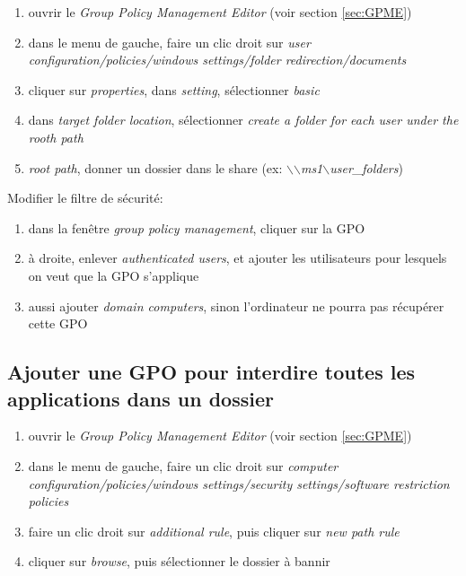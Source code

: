 \documentclass[a4paper]{article}
\begin{document}
\begin{enumerate}
    \item ouvrir le \textit{Group Policy Management Editor} (voir section \ref{sec:GPME})
    \item dans le menu de gauche, faire un clic droit sur \textit{user configuration/policies/windows settings/folder redirection/documents}
    \item cliquer sur \textit{properties}, dans \textit{setting}, sélectionner \textit{basic}
    \item dans \textit{target folder location}, sélectionner \textit{create a folder for each user under the rooth path}
    \item \textit{root path}, donner un dossier dans le share (ex: \textit{$\backslash$$\backslash$ms1$\backslash$user\_folders})
\end{enumerate}
Modifier le filtre de sécurité:
\begin{enumerate}
    \item dans la fenêtre \textit{group policy management}, cliquer sur la GPO
    \item à droite, enlever \textit{authenticated users}, et ajouter les utilisateurs pour lesquels on veut que la GPO s'applique
    \item aussi ajouter \textit{domain computers}, sinon l'ordinateur ne pourra pas récupérer cette GPO
\end{enumerate}





\subsection{Ajouter une GPO pour interdire toutes les applications dans un dossier}



\begin{enumerate}
    \item ouvrir le \textit{Group Policy Management Editor} (voir section \ref{sec:GPME})
    \item dans le menu de gauche, faire un clic droit sur \textit{computer configuration/policies/windows settings/security settings/software restriction policies}
    \item faire un clic droit sur \textit{additional rule}, puis cliquer sur \textit{new path rule}
    \item cliquer sur \textit{browse}, puis sélectionner le dossier à bannir
\end{enumerate}
\end{document}
